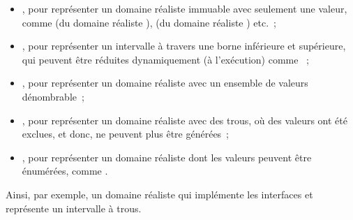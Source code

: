 \begin{itemize}

\item {}, pour représenter un domaine réaliste immuable avec
seulement une valeur, comme  (du domaine réaliste ),
 (du domaine réaliste ) etc.~;

\item {}, pour représenter un intervalle à travers une borne
inférieure et supérieure, qui peuvent être réduites dynamiquement (à
l'exécution) comme ~;

\item {}, pour représenter un domaine réaliste avec un ensemble de
valeurs dénombrable~;

\item {}, pour représenter un domaine réaliste avec des trous, \ie
où des valeurs ont été exclues, et donc, ne peuvent plus être générées~;

\item {}, pour représenter un domaine réaliste dont les valeurs
peuvent être énumérées, comme .

\end{itemize}

Ainsi, par exemple, un domaine réaliste qui implémente les interfaces
 et  représente un intervalle à trous.
